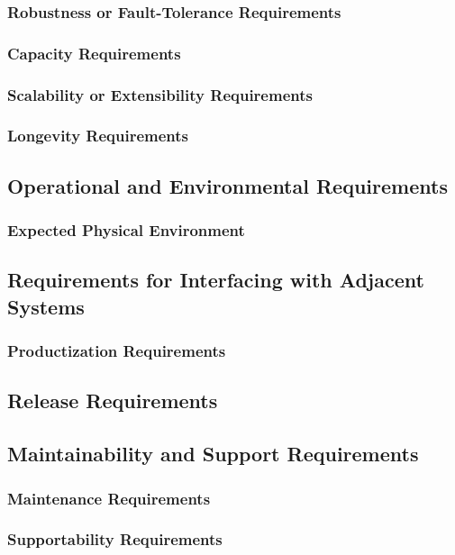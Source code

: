 \documentclass{article}
\begin{document}
    \subsubsection{Robustness or Fault-Tolerance Requirements}
    \subsubsection{Capacity Requirements}
    \subsubsection{Scalability or Extensibility Requirements}
    \subsubsection{Longevity Requirements}

\subsection{Operational and Environmental Requirements}
    \subsubsection{Expected Physical Environment}
    
\subsection{Requirements for Interfacing with Adjacent Systems}
    \subsubsection{Productization Requirements}
 \subsection{Release Requirements}
 \subsection{Maintainability and Support Requirements}
    \subsubsection{Maintenance Requirements}
    \subsubsection{Supportability Requirements}
\end{document}

